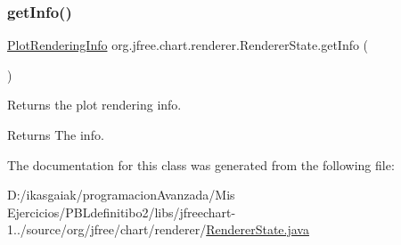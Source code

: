 \subsubsection{\texorpdfstring{get\+Info()}{getInfo()}}
{\footnotesize\ttfamily \mbox{\hyperlink{classorg_1_1jfree_1_1chart_1_1plot_1_1_plot_rendering_info}{Plot\+Rendering\+Info}} org.\+jfree.\+chart.\+renderer.\+Renderer\+State.\+get\+Info (\begin{DoxyParamCaption}{ }\end{DoxyParamCaption})}

Returns the plot rendering info.

\begin{DoxyReturn}{Returns}
The info. 
\end{DoxyReturn}


The documentation for this class was generated from the following file\+:\begin{DoxyCompactItemize}
\item 
D\+:/ikasgaiak/programacion\+Avanzada/\+Mis Ejercicios/\+P\+B\+Ldefinitibo2/libs/jfreechart-\/1../source/org/jfree/chart/renderer/\mbox{\hyperlink{_renderer_state_8java}{Renderer\+State.\+java}}\end{DoxyCompactItemize}
